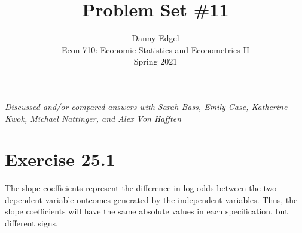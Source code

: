 \documentclass{article}
\begin{document}

\title{	Problem Set \#11 }
\author{ 	Danny Edgel 										\\ 
			Econ 710: Economic Statistics and Econometrics II	\\
			Spring 2021											\\
		}
\maketitle\thispagestyle{empty}


\noindent\textit{Discussed and/or compared answers with Sarah Bass, Emily Case, Katherine Kwok, Michael Nattinger, and Alex Von Hafften}



\section*{Exercise 25.1}
The slope coefficients represent the difference in log odds between the two dependent variable outcomes generated by the independent variables. Thus, the slope coefficients will have the same absolute values in each specification, but different signs.

\end{document}
